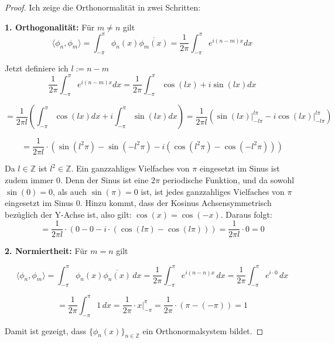 \documentclass[a4paper,12pt]{article}
\theoremstyle{definition}
\theoremstyle{remark}
\begin{document}
    \begin{proof}
        Ich zeige die Orthonormalität in zwei Schritten: 
            
        \textbf{1. Orthogonalität:}  
        Für $m \neq n$ gilt
        $$\langle \phi_n, \phi_m \rangle = \int_{-\pi}^{\pi}{\phi_n(x) \overline{\phi_m(x)}} = \frac{1}{2\pi}\int_{-\pi}^\pi{e^{i(n-m)x}dx}$$
            
        Jetzt definiere ich $l := n-m$
        \[\frac{1}{2\pi}\int_{-\pi}^\pi{e^{i(n-m)x}dx} = \frac{1}{2\pi}\int_{-\pi}^\pi{\cos(lx) + i \sin (lx)} dx\] 
            
        \[= \frac{1}{2\pi l}\left(\int_{-\pi}^\pi{\cos (lx) dx} + i\int_{-\pi}^\pi{ \sin (lx) dx} \right)  = \frac{1}{2\pi l} \left(\sin(lx)\big|_{-l\pi}^{l\pi} - i\cos(lx)\big|_{-l\pi}^{l\pi} \right)\]
            
        \[= \frac{1}{2\pi l} \cdot \left(\sin(l^2\pi) - \sin(-l^2\pi) - i\left(\cos(l^2\pi) - \cos(-l^2\pi)\right)\right) \]
            
        Da $l\in \mathbb{Z}$ ist $l^2 \in \mathbb{Z}$. Ein ganzzahliges Vielfaches von $\pi$
        eingesetzt im Sinus ist zudem immer 0. Denn der Sinus ist eine $2\pi$ periodische Funktion, und da
        sowohl $\sin(0) = 0$, als auch $\sin (\pi) = 0$ ist, ist jedes ganzzahliges Vielfaches von $\pi$ eingesetzt 
        im Sinus 0. Hinzu kommt, dass der Kosinus Achsensymmetrisch bezüglich der Y-Achse ist, also gilt:
        $\cos (x) =  \cos (-x)$. Daraus folgt:
        \[= \frac{1}{2\pi l} \cdot (0 - 0 - i\cdot(\cos(l\pi) - \cos(l\pi))) = \frac{1}{2\pi l} \cdot 0 = 0\]
            
            
        \textbf{2. Normiertheit:}  
        Für $m = n$ gilt
            
        \[\langle \phi_n, \phi_m \rangle = \int_{-\pi}^{\pi} \phi_n(x) \overline{\phi_n(x)} \, dx = \frac{1}{2\pi} \int_{-\pi}^{\pi} e^{i(n -n) x}\, dx = \frac{1}{2\pi} \int_{-\pi}^{\pi} e^{i\cdot0} \, dx\]
            
        \[= \frac{1}{2\pi} \int_{-\pi}^{\pi} 1 \, dx = \frac{1}{2\pi} \cdot x \Big|_{-\pi}^{\pi} = \frac{1}{2\pi} \cdot (\pi-(-\pi)) = 1\]
            
        Damit ist gezeigt, dass $\{\phi_n(x)\}_{n\in\mathbb{Z}}$ ein Orthonormalsystem bildet.
        \end{proof}
\end{document}

